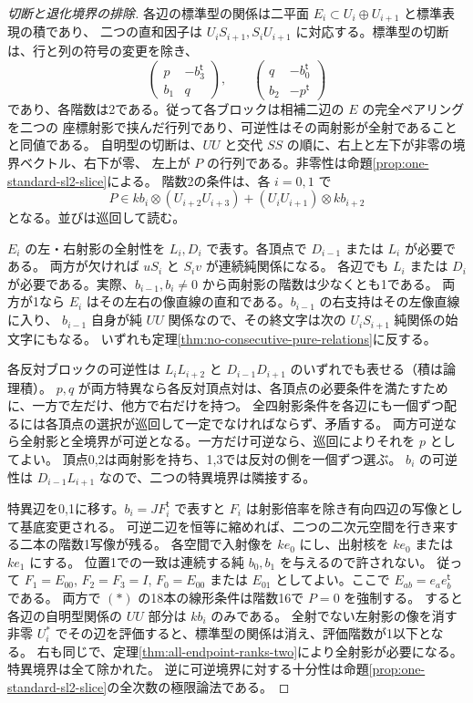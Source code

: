\begin{proof}[切断と退化境界の排除]
各辺の標準型の関係は二平面 $E_i\subset U_i\oplus U_{i+1}$ と標準表現の積であり、
二つの直和因子は $U_i S_{i+1},S_i U_{i+1}$ に対応する。標準型の切断は、行と列の符号の変更を除き、
\[
 \begin{pmatrix}p&-b_3^{\mathsf t}\\ b_1&q\end{pmatrix},\qquad
 \begin{pmatrix}q&-b_0^{\mathsf t}\\ b_2&-p^{\mathsf t}\end{pmatrix}
\]
であり、各階数は2である。従って各ブロックは相補二辺の $E$ の完全ペアリングを二つの
座標射影で挟んだ行列であり、可逆性はその両射影が全射であることと同値である。
自明型の切断は、$UU$ と交代 $SS$ の順に、右上と左下が非零の境界ベクトル、右下が零、
左上が $P$ の行列である。非零性は命題\ref{prop:one-standard-sl2-slice}による。
階数2の条件は、各 $i=0,1$ で
\[
 P\in kb_i\otimes (U_{i+2}U_{i+3})+(U_i U_{i+1})\otimes kb_{i+2}
 \tag{*}
\]
となる。並びは巡回して読む。

$E_i$ の左・右射影の全射性を $L_i,D_i$ で表す。各頂点で $D_{i-1}$ または $L_i$ が必要である。
両方が欠ければ $u S_i$ と $S_i v$ が連続純関係になる。
各辺でも $L_i$ または $D_i$ が必要である。実際、$b_{i-1},b_i\ne0$ から両射影の階数は少なくとも1である。
両方が1なら $E_i$ はその左右の像直線の直和である。$b_{i-1}$ の右支持はその左像直線に入り、
$b_{i-1}$ 自身が純 $UU$ 関係なので、その終文字は次の $U_i S_{i+1}$ 純関係の始文字にもなる。
いずれも定理\ref{thm:no-consecutive-pure-relations}に反する。

各反対ブロックの可逆性は $L_i L_{i+2}$ と $D_{i-1}D_{i+1}$ のいずれでも表せる（積は論理積）。
$p,q$ が両方特異なら各反対頂点対は、各頂点の必要条件を満たすために、一方で左だけ、他方で右だけを持つ。
全四射影条件を各辺にも一個ずつ配るには各頂点の選択が巡回して一定でなければならず、矛盾する。
両方可逆なら全射影と全境界が可逆となる。一方だけ可逆なら、巡回によりそれを $p$ としてよい。
頂点0,2は両射影を持ち、1,3では反対の側を一個ずつ選ぶ。
$b_i$ の可逆性は $D_{i-1}L_{i+1}$ なので、二つの特異境界は隣接する。

特異辺を0,1に移す。$b_i=JF_i^{\mathsf t}$ で表すと $F_i$ は射影倍率を除き有向四辺の写像として基底変更される。
可逆二辺を恒等に縮めれば、二つの二次元空間を行き来する二本の階数1写像が残る。
各空間で入射像を $ke_0$ にし、出射核を $ke_0$ または $ke_1$ にする。
位置1での一致は連続する純 $b_0,b_1$ を与えるので許されない。
従って $F_1=E_{00}$, $F_2=F_3=I$, $F_0=E_{00}$ または $E_{01}$ としてよい。ここで $E_{ab}=e_a e_b^{\mathsf t}$ である。
両方で $(*)$ の18本の線形条件は階数16で $P=0$ を強制する。
すると各辺の自明型関係の $UU$ 部分は $kb_i$ のみである。
全射でない左射影の像を消す非零 $U_i^*$ でその辺を評価すると、標準型の関係は消え、評価階数が1以下となる。
右も同じで、定理\ref{thm:all-endpoint-ranks-two}により全射影が必要になる。特異境界は全て除かれた。
逆に可逆境界に対する十分性は命題\ref{prop:one-standard-sl2-slice}の全次数の極限論法である。
\end{proof}

